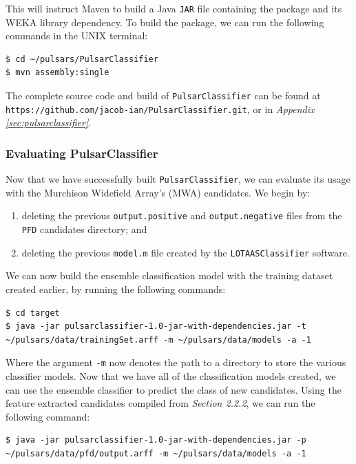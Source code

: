 \documentclass{article}
\begin{document}
This will instruct Maven to build a Java \verb|JAR| file containing the package and its WEKA library dependency. To build the package, we can run the following commands in the UNIX terminal:

\begin{lstlisting}[numbers=none]
$ cd ~/pulsars/PulsarClassifier
$ mvn assembly:single
\end{lstlisting}

The complete source code and build of \verb|PulsarClassifier| can be found at \verb|https://github.com/jacob-ian/PulsarClassifier.git|, or in \emph{Appendix \ref{sec:pulsarclassifier}}.

\subsubsection{Evaluating PulsarClassifier}

Now that we have successfully built \verb|PulsarClassifier|, we can evaluate its usage with the Murchison Widefield Array's (MWA) candidates. We begin by:
\begin{enumerate}[label=\roman*.] 
    \item deleting the previous \verb|output.positive| and \verb|output.negative| files from the \verb|PFD| candidates directory; and
    \item deleting the previous \verb|model.m| file created by the \verb|LOTAASClassifier| software.
\end{enumerate}

We can now build the ensemble classification model with the training dataset created earlier, by running the following commands:

\begin{lstlisting}[numbers=none]
$ cd target
$ java -jar pulsarclassifier-1.0-jar-with-dependencies.jar -t ~/pulsars/data/trainingSet.arff -m ~/pulsars/data/models -a -1
\end{lstlisting}

Where the argument \verb|-m| now denotes the path to a directory to store the various classifier models. Now that we have all of the classification models created, we can use the ensemble classifier to predict the class of new candidates. Using the feature extracted candidates compiled from \emph{Section 2.2.2}, we can run the following command:

\begin{lstlisting}[numbers=none]
$ java -jar pulsarclassifier-1.0-jar-with-dependencies.jar -p ~/pulsars/data/pfd/output.arff -m ~/pulsars/data/models -a -1
\end{lstlisting}
\end{document}
